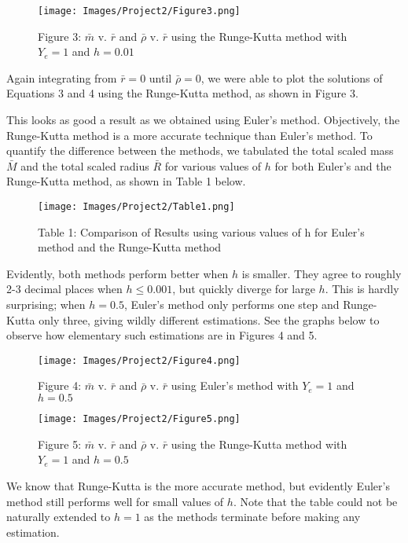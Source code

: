 \documentclass[10pt]{article}
\begin{document}
{\begin{figure}[h!]
\texttt{[image: Images/Project2/Figure3.png]} \centering \caption*{\footnotesize Figure 3: $\bar{m}$ v. $\bar{r}$ and $\bar{\rho}$ v. $\bar{r}$ using the Runge-Kutta method with $Y_e = 1$ and $h = 0.01$} \end{figure}

Again integrating from $\bar{r}=0$ until $\bar{\rho}=0$, we were able to plot the solutions of Equations 3 and 4 using the Runge-Kutta method, as shown in Figure 3.


This looks as good a result as we obtained using Euler's method. Objectively, the Runge-Kutta method is a more accurate technique than Euler's method. To quantify the difference between the methods, we tabulated the total scaled mass $\bar{M}$ and the total scaled radius $\bar{R}$ for various values of $h$ for both Euler's and the Runge-Kutta method, as shown in Table 1 below.

\begin{figure}[h!]
\texttt{[image: Images/Project2/Table1.png]} \centering \caption*{\footnotesize Table 1: Comparison of Results using various values of h for Euler's method and the Runge-Kutta method} \end{figure}

Evidently, both methods perform better when $h$ is smaller. They agree to roughly 2-3 decimal places when $h\le0.001$, but quickly diverge for large $h$. This is hardly surprising; when $h=0.5$, Euler's method only performs one step and Runge-Kutta only three, giving wildly different estimations. See the graphs below to observe how elementary such estimations are in Figures 4 and 5. \\

\begin{figure}[h!]
\texttt{[image: Images/Project2/Figure4.png]} \centering \caption*{\footnotesize Figure 4: $\bar{m}$ v. $\bar{r}$ and $\bar{\rho}$ v. $\bar{r}$ using Euler's method with $Y_e = 1$ and $h = 0.5$} \end{figure}

\begin{figure}[h!]
\texttt{[image: Images/Project2/Figure5.png]} \centering \caption*{\footnotesize Figure 5: $\bar{m}$ v. $\bar{r}$ and $\bar{\rho}$ v. $\bar{r}$ using the Runge-Kutta method with $Y_e = 1$ and $h = 0.5$} \end{figure} 

 We know that Runge-Kutta is the more accurate method, but evidently Euler's method still performs well for small values of $h$. Note that the table could not be naturally extended to $h=1$ as the methods terminate before making any estimation.

}
\end{document}
